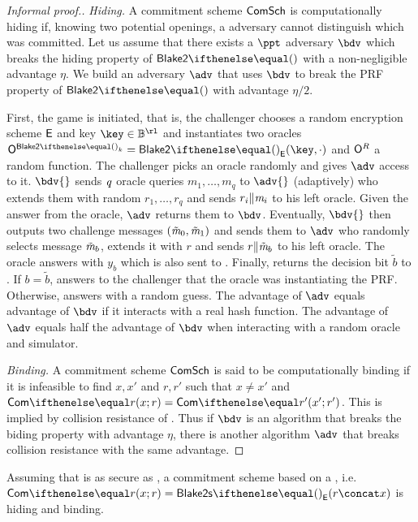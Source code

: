 \begin{proof}[Informal proof.]
\emph{Hiding.}
    A commitment scheme $\mathsf{ComSch}$ is computationally hiding if, knowing two potential openings, a \ppt{} adversary cannot distinguish which was committed. Let us assume that there exists a $\ppt$ adversary $\bdv$ which breaks the hiding property of $\blake{2}{}$ with a non-negligible advantage $\eta$. We build an adversary $\adv$ that uses $\bdv$ to break the PRF property of $\blake{2}{}$ with advantage $\eta/2$.

    First, the \prf{} game is initiated, that is, the challenger chooses a random encryption scheme $\mathsf{E}$ and key $\key \in \BB^\rl$ and instantiates two oracles $\oracle{\blake{2}{}_k} = \blake{2}{}_{\Enc}(\key, \cdot)$ and $\mathsf{O}^{R}$ a random function. The challenger picks an oracle randomly and gives $\adv$ access to it.
    $\bdv{}$ sends $\mathit{q}$ oracle queries $m_1, \ldots, m_q$ to $\adv{}$ (adaptively) who extends them with random $r_1, \ldots, r_q$ and sends $r_i \| \mathit{m}_i$ to his left oracle. Given the answer from the oracle, $\adv$  returns them to $\bdv$.
    Eventually, $\bdv{}$ then outputs two challenge messages $(\tilde{\mathit{m}}_0, \tilde{\mathit{m}}_1)$ and sends them to $\adv$ who randomly selects message $\tilde{\mathit{m}}_b$, extends it with $r$ and sends $r \| \tilde{\mathit{m}}_b$ to his left oracle.
    The oracle answers with $y_b$ which is also sent to \bdv{}.
    Finally, \bdv{} returns the decision bit $\tilde{b}$ to \adv. If $b = \tilde{b}$, \adv{} answers to the challenger that the oracle was instantiating the PRF. Otherwise, \adv{} answers with a random guess.
    The advantage of $\adv$ equals advantage of $\bdv$ if it interacts with a real hash function. The advantage of $\adv$ equals half the advantage of $\bdv$ when interacting with a random oracle and simulator.

\emph{Binding.}
    A commitment scheme $\mathsf{ComSch}$ is said to be computationally binding if it is infeasible to find $x, x'$ and $r, r'$ such that $x \neq x'$ and $\commit{x}{r} = \commit{x'}{r'}$. This is implied by collision resistance of . Thus if $\bdv$ is an algorithm that breaks the biding property with advantage $\eta$, there is another algorithm $\adv$ that breaks  collision resistance with the same advantage.
\end{proof}

Assuming that  is as secure as , a commitment scheme based on a , i.e.~$\commit{x}{r} = \blake{2s}{}_{\Enc}(r \concat x)$ is hiding and binding.

